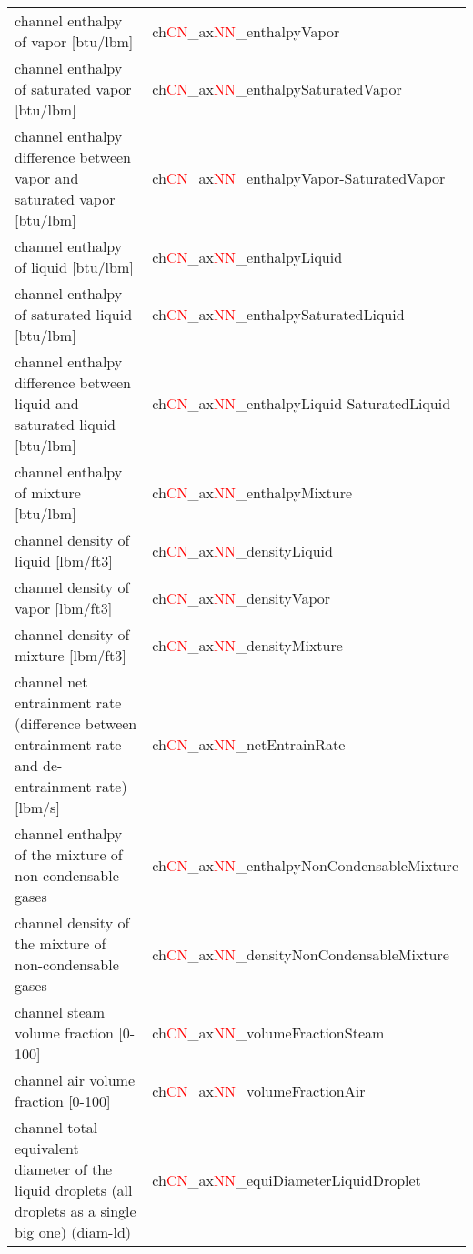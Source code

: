 \begin{itemize}
\begin{table}[h]
\begin{tabular}{|l|l|}
     channel enthalpy of vapor [btu/lbm] & ch\textcolor{red}{CN}\_ax\textcolor{red}{NN}\_enthalpyVapor \\
     channel enthalpy of saturated vapor [btu/lbm] & ch\textcolor{red}{CN}\_ax\textcolor{red}{NN}\_enthalpySaturatedVapor \\
     channel enthalpy difference between vapor and saturated vapor [btu/lbm] & ch\textcolor{red}{CN}\_ax\textcolor{red}{NN}\_enthalpyVapor-SaturatedVapor \\
     channel enthalpy of liquid [btu/lbm] & ch\textcolor{red}{CN}\_ax\textcolor{red}{NN}\_enthalpyLiquid \\
     channel enthalpy of saturated liquid [btu/lbm] & ch\textcolor{red}{CN}\_ax\textcolor{red}{NN}\_enthalpySaturatedLiquid \\
     channel enthalpy difference between liquid and saturated liquid [btu/lbm] & ch\textcolor{red}{CN}\_ax\textcolor{red}{NN}\_enthalpyLiquid-SaturatedLiquid \\
     channel enthalpy of mixture [btu/lbm] & ch\textcolor{red}{CN}\_ax\textcolor{red}{NN}\_enthalpyMixture \\
     channel density of liquid [lbm/ft3] & ch\textcolor{red}{CN}\_ax\textcolor{red}{NN}\_densityLiquid \\
     channel density of vapor [lbm/ft3] & ch\textcolor{red}{CN}\_ax\textcolor{red}{NN}\_densityVapor \\
     channel density of mixture [lbm/ft3] & ch\textcolor{red}{CN}\_ax\textcolor{red}{NN}\_densityMixture \\
     channel net entrainment rate (difference between entrainment rate and de-entrainment rate) [lbm/s] & ch\textcolor{red}{CN}\_ax\textcolor{red}{NN}\_netEntrainRate \\
     channel enthalpy of the mixture of non-condensable gases & ch\textcolor{red}{CN}\_ax\textcolor{red}{NN}\_enthalpyNonCondensableMixture \\ 
     channel density of the mixture of non-condensable gases & ch\textcolor{red}{CN}\_ax\textcolor{red}{NN}\_densityNonCondensableMixture \\
     channel steam volume fraction [0-100] & ch\textcolor{red}{CN}\_ax\textcolor{red}{NN}\_volumeFractionSteam \\
     channel air volume fraction [0-100] & ch\textcolor{red}{CN}\_ax\textcolor{red}{NN}\_volumeFractionAir \\
     channel total equivalent diameter of the liquid droplets (all droplets as a single big one) (diam-ld) & ch\textcolor{red}{CN}\_ax\textcolor{red}{NN}\_equiDiameterLiquidDroplet \\ 

\end{tabular}
\end{table}
\end{itemize}
